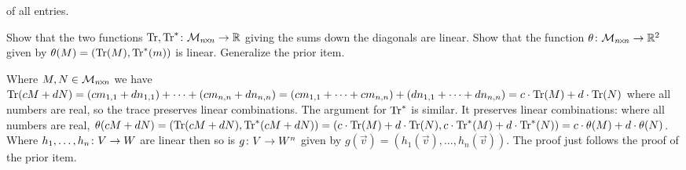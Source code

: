 \begin{exercises}
\begin{answer}
\begin{exparts}
          of all entries.
      \end{exparts}
    \end{answer}
  \item   \label{exer:TraceIsLinear}
    \begin{exparts}
      \partsitem 
        Show that the two functions 
        $\mbox{$\operatorname{Tr},\operatorname{Tr}^*\colon \mathcal{M}_{n \! \times \! n}\to \mathbb{R}$}$
        giving the sums down the diagonals are linear.
      \partsitem
        Show that the function
       $\mbox{$\theta\colon \mathcal{M}_{n \! \times \! n}\to \mathbb{R}^2$}$
       given by $\theta(M)=(\operatorname{Tr}(M),\operatorname{Tr}^*(m))$
       is linear.
     \partsitem
       Generalize the prior item. 
    \end{exparts}
    \begin{answer}
      \begin{exparts}
        \partsitem
          Where $M,N\in\mathcal{M}_{n \! \times \! n}$ we have 
          $\operatorname{Tr}(cM+dN)=(cm_{1,1}+dn_{1,1})+\cdots+(cm_{n,n}+dn_{n,n})
          =(cm_{1,1}+\cdots+cm_{n,n})+(dn_{1,1}+\cdots+dn_{n,n})
          =c\cdot\operatorname{Tr}(M)+d\cdot\operatorname{Tr}(N)$ where
          all numbers are real, so the trace preserves linear
         combinations.
         The argument for $\operatorname{Tr}^*$ is similar.
       \partsitem
         It preserves linear combinations: where all numbers are real,
          $\theta(cM+dN)=(\operatorname{Tr}(cM+dN),\operatorname{Tr}^*(cM+dN))
          =(c\cdot\operatorname{Tr}(M)+d\cdot\operatorname{Tr}(N), c\cdot\operatorname{Tr}^*(M)+d\cdot\operatorname{Tr}^*(N))
          =c\cdot\theta(M)+d\cdot\theta(N)$.
       \partsitem   
         Where $\mbox{$h_1,\ldots,h_n\colon V\to W$}$ are linear then so is
         $\mbox{$g\colon V\to W^n$}$ given by
         $g(\vec{v})=(h_1(\vec{v}), \ldots, h_n(\vec{v}))$.
         The proof just follows the proof of the prior item.
      \end{exparts}
    \end{answer}

        

\end{exercises}
\endinput


